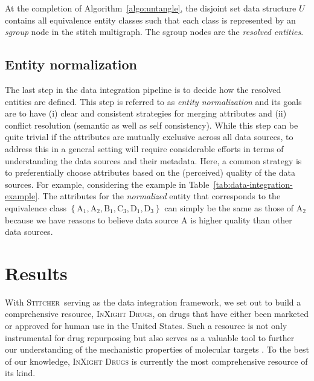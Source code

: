 \documentclass{bmcart}
\newcommand\st{\textsc{Stitcher}}
\newcommand\ix{\textsc{InXight Drugs}}
\begin{document}
At the completion of Algorithm~\ref{algo:untangle}, the disjoint set
data structure $U$ contains all equivalence entity classes such that
each class is represented by an \emph{sgroup} node in the stitch
multigraph. The sgroup nodes are the \emph{resolved entities}.

\subsection*{Entity normalization}
The last step in the data integration pipeline is to decide how the
resolved entities are defined. This step is referred to as \emph{entity
normalization} and its goals are to have (i) clear and consistent
strategies for merging attributes and (ii) conflict resolution
(semantic as well as self consistency). While this step can be quite
trivial if the attributes are mutually exclusive across all data
sources, to address this in a general setting will require considerable
efforts in terms of understanding the data sources and their metadata.
Here, a common strategy is to preferentially choose attributes based
on the (perceived) quality of the data sources. For example,
considering the example in Table~\ref{tab:data-integration-example}.
The attributes for the \emph{normalized} entity that corresponds to
the equivalence class $\left\{\textrm{A}_1, \textrm{A}_2, \textrm{B}_1,
\textrm{C}_3, \textrm{D}_1, \textrm{D}_3\right\}$ can simply be the
same as those of $\textrm{A}_2$ because we have reasons to believe
data source A is higher quality than other data sources.

\section*{Results}
With \st\ serving as the data integration framework, we set out to
build a comprehensive resource, \ix, on drugs that
have either been marketed or approved for human use in the United
States. Such a resource is not only instrumental for drug repurposing
but also serves as a valuable tool to further our understanding of the
mechanistic properties of molecular targets
\cite{Huang2011,Huang2019}. To the best of our knowledge, \ix{} is
currently the most comprehensive resource of its kind.
\end{document}
